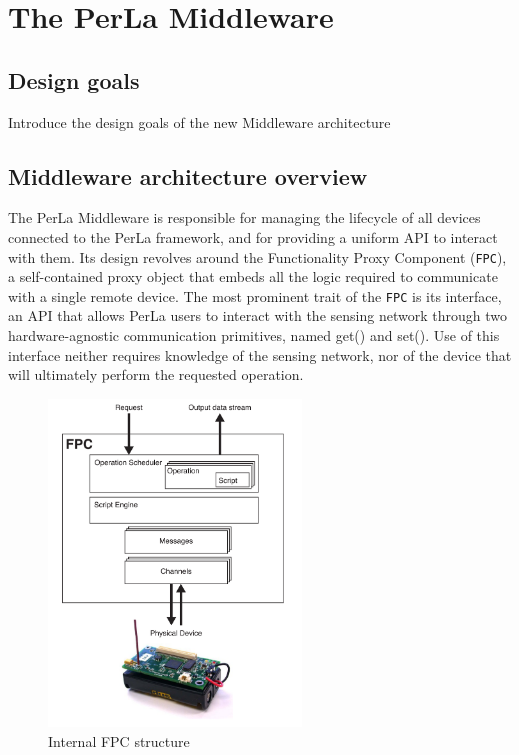 \chapter{The PerLa Middleware}

\section{Design goals}

Introduce the design goals of the new Middleware architecture

\section{Middleware architecture overview}

The PerLa Middleware is responsible for managing the lifecycle of all devices
connected to the PerLa framework, and for providing a uniform API to interact
with them. Its design revolves around the Functionality Proxy Component
(\texttt{FPC}), a self-contained proxy object that embeds all the logic
required to communicate with a single remote device.  The most prominent trait
of the \texttt{FPC} is its interface, an API that allows PerLa users to
interact with the sensing network through two hardware-agnostic communication
primitives, named get() and set(). Use of this interface neither requires
knowledge of the sensing network, nor of the device that will ultimately
perform the requested operation.

\begin{figure}[h!]
\center
\includegraphics[width=0.6\textwidth]{imgs/fpc.pdf}
\caption{Internal FPC structure}
\label{fig:fpc_overview}
\end{figure}

